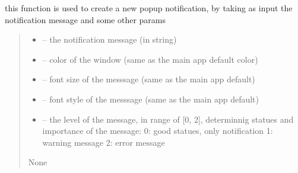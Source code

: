 \documentclass[letterpaper,10pt,english]{sphinxmanual}
\begin{document}
\begin{savenotes}
\begin{fulllineitems}
\begin{savenotes}\begin{fulllineitems}
\label{\detokenize{setting/notif_UI:oxin.notif_UI.notification_manager.create_new_notif}}
\pysigstartsignatures
{}
\pysigstopsignatures
\sphinxAtStartPar
this function is used to create a new pop\sphinxhyphen{}up notification, by taking as input the notification message and some other params
\begin{quote}\begin{description}
\begin{itemize}
\item {} 
\sphinxAtStartPar
{} – the notification message (in string)

\item {} 
\sphinxAtStartPar
{} – color of the window (same as the main app default color)

\item {} 
\sphinxAtStartPar
{} – font size of the messsage (same as the main app default)

\item {} 
\sphinxAtStartPar
{} – font style of the messsage (same as the main app default)

\item {} 
\sphinxAtStartPar
{} – the level of the message, in range of {[}0, 2{]}, determinnig statues and importance of the message:
0: good statues, only notification
1: warning message
2: error message

\end{itemize}

\sphinxAtStartPar
None

\end{description}\end{quote}

\end{fulllineitems}\end{savenotes}


\end{fulllineitems}\end{savenotes}
\end{document}
